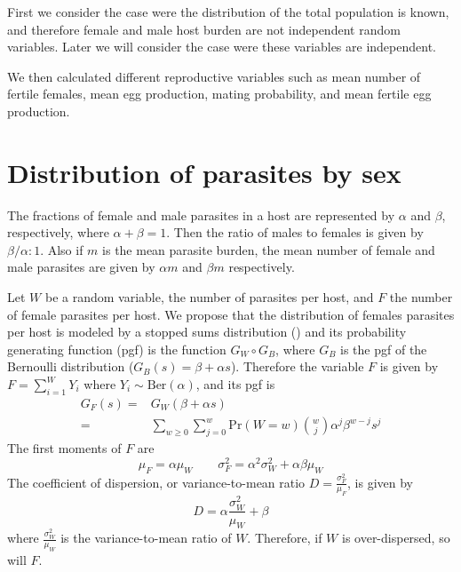 \documentclass[bimj,fleqn]{w-art}
\theoremstyle{plain}
\theoremstyle{definition}
\begin{document}
First we consider the case were the distribution of the total population is known, and therefore female and male host burden are not independent random variables. Later we will consider the case were these variables are independent. 


We then calculated different reproductive variables such as mean number of fertile females, mean egg production, mating probability, and mean fertile egg production.

\section{Distribution of parasites by sex}
\label{sec:distsexo}
The fractions of female and male parasites in a host are represented  by $\alpha$ and $\beta$, respectively, where $\alpha+\beta=1$.
Then the ratio of males to females is given by $\beta / \alpha : 1$. Also if $m$ is the mean parasite burden, the mean number of
female and male parasites are given by $\alpha m$ and $\beta m $ respectively.


Let $W$ be a random variable, the number of parasites per host, and %
$F$ the number of female parasites per host.
We propose that the distribution of females parasites per host is modeled by a stopped sums distribution (\cite{johnson2005univariate}) and its probability generating function (pgf) is the function $G_W \circ G_B$, where $G_B$  is the pgf of the Bernoulli distribution ($G_B(s)=\beta + \alpha s$)\cite{johnson2005univariate}. 
Therefore the variable $F$ is given by $F=\sum_{i=1} ^W Y_i$ where $Y_i\sim \mathrm{Ber}(\alpha)$, and its pgf is 
\begin{equation}\label{genf}
\begin{split}
G_F(s)=&G_W(\beta + \alpha s)\\
=&\sum_{w\geq 0}\sum_{j=0}^{w} \mathrm{Pr}(W=w)\binom{w}{j}\alpha^j\beta^{w-j}s^j
\end{split}
\end{equation}
The first moments of $F$ are
\begin{equation}
\mu_F=\alpha \mu_W \qquad \sigma_F^2=\alpha^2\sigma_W^2+ \alpha\beta\mu_W
\end{equation}
The coefficient of dispersion, or variance-to-mean ratio 
$D=\frac{\sigma_F^2}{\mu_F}$, is given by \[D=\alpha\frac{\sigma_W^2}{\mu_W}+\beta\]
where $\frac{\sigma_W^2}{\mu_W}$ 
is the variance-to-mean ratio of $W$.
Therefore, if $W$ is over-dispersed, so will $F$. 
\end{document}
